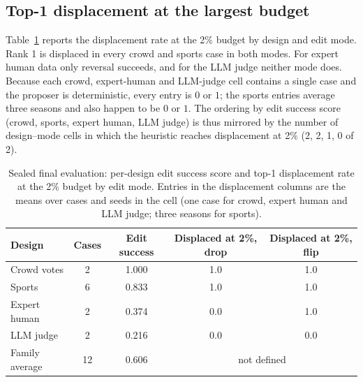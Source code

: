 \documentclass{article}
\begin{document}
\subsection{Top-1 displacement at the largest budget}
Table~\ref{tab:disp} reports the displacement rate at the 2\% budget by design and edit mode. %
Rank 1 is displaced in every crowd and sports case in both modes. For expert human data only reversal succeeds, and for the LLM judge neither mode does. Because each crowd, expert-human and LLM-judge cell contains a single case and the proposer is deterministic, every entry is $0$ or $1$; the sports entries average three seasons and also happen to be $0$ or $1$.
The ordering by edit success score (crowd, sports, expert human, LLM judge) is thus mirrored by the number of design--mode cells in which the heuristic reaches displacement at 2\% (2, 2, 1, 0 of 2).

\begin{table}[t]
\centering
\caption{Sealed final evaluation: per-design edit success score and top-1 displacement rate at the 2\% budget by edit mode. Entries in the displacement columns are the means over cases and seeds in the cell (one case for crowd, expert human and LLM judge; three seasons for sports).}
\label{tab:disp}
\small
\begin{tabular}{lcccc}
\toprule
Design & Cases & Edit success & Displaced at 2\%, drop & Displaced at 2\%, flip \\
\midrule
Crowd votes  & 2 & 1.000 & 1.0 & 1.0 \\ %
Sports       & 6 & 0.833 & 1.0 & 1.0 \\ %
Expert human & 2 & 0.374 & 0.0 & 1.0 \\ %
LLM judge    & 2 & 0.216 & 0.0 & 0.0 \\ %
\midrule
Family average & 12 & 0.606 & \multicolumn{2}{c}{not defined} \\
\bottomrule
\end{tabular}
\end{table}
\end{document}
